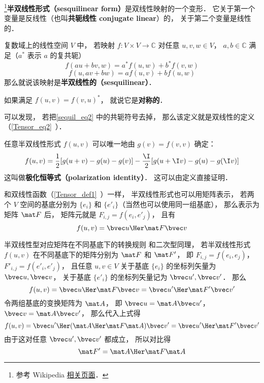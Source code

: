 
\begin{issues}
\issueDraft
\end{issues}

\footnote{参考 Wikipedia \href{https://en.wikipedia.org/wiki/Sesquilinear_form}{相关页面}．}\textbf{半双线性形式（sesquilinear form）}是双线性映射的一个变形． 它关于第一个变量是反线性（也叫\textbf{共轭线性 conjugate linear}）的， 关于第二个变量是线性的．
\begin{definition}{}\label{sequil_def1}
复数域上的线性空间 $V$ 中， 若映射 $f:V\times V\to \mathbb C$ 对任意 $u, v, w\in V$， $a,b\in \mathbb C$ 满足（$a^*$ 表示 $a$ 的复共轭）
\begin{equation}\label{sequil_eq2}
f(au+bv, w) = a^*f(u, w) + b^*f(v, w)
\end{equation}
\begin{equation}\label{sequil_eq1}
f(u, av+bw) = af(u, v) + bf(u, w)
\end{equation}
那么就说该映射是\textbf{半双线性的（sesquilinear）}．
\end{definition}
如果满足 $f(u, v) = f(v, u)^*$， 就说它是\textbf{对称的}．

可以发现， 若把\autoref{sequil_eq2} 中的共轭符号去掉， 那么该定义就是双线性的定义（\autoref{Tensor_eq2}~）．

任意半双线性形式 $f(u, v)$ 可以唯一地由 $g(v) = f(v, v)$ 确定：
\begin{equation}
f(u, v) =\frac{1}{2}[g(u+v)-g(u)-g(v)]
-\frac{\I}{2}[g(u+\I v)-g(u)-g(\I v)]
\end{equation}
这叫做\textbf{极化恒等式（polarization identity）}． 这可以由定义直接证明．

和双线性函数（\autoref{Tensor_def1}~）一样， 半双线性形式也可以用矩阵表示， 若两个 $V$ 空间的基底分别为 $\{e_i\}$ 和 $\{e'_i\}$（当然也可以使用同一组基底）， 那么表示为矩阵 $\mat F$ 后， 矩阵元就是 $F_{i,j} = f(e_i, e'_j)$， 且有
\begin{equation}
f(u, v) = \bvec u\Her \mat F \bvec v
\end{equation}

\begin{example}{半双线性型对应矩阵在不同基底下的转换规则}\label{sequil_ex1}
和二次型同理， 若半双线性形式 $f(u, v)$ 在不同基底下的矩阵分别为 $\mat F$ 和 $\mat F'$， 即 $F_{i,j} = f(e_i, e_j)$， $F'_{i,j} = f(e'_i, e'_j)$， 且任意 $u, v\in V$ 关于基底 $\{e_i\}$ 的坐标列矢量为 $\bvec u, \bvec v$， 关于基底 $\{e'_i\}$ 的坐标列矢量记为 $\bvec u', \bvec v'$． 那么
\begin{equation}
f(u, v) = \bvec u\Her \mat F \bvec v = {\bvec u'}\Her \mat F' \bvec v'
\end{equation}
令两组基底的变换矩阵为 $\mat A$， 即 $\bvec u = \mat A\bvec u'$， $\bvec v = \mat A \bvec v'$， 那么代入上式得
\begin{equation}
f(u, v) = {\bvec u'}\Her (\mat A\Her \mat F \mat A) \bvec v' = {\bvec u'}\Her \mat F' \bvec v'
\end{equation}
由于这对任意 $\bvec u', \bvec v'$ 都成立， 所以对比得
\begin{equation}
\mat F' = \mat A\Her \mat F \mat A
\end{equation}
\end{example}

